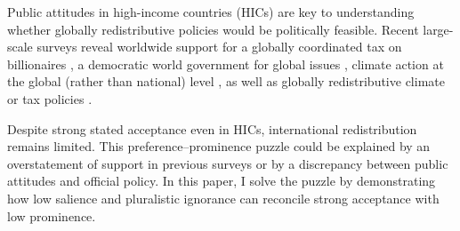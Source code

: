 \documentclass[12pt,english]{article}
\begin{document}
\begin{bibunit}
Public attitudes in high-income countries (HICs) are key to understanding whether globally redistributive policies would be politically feasible. 
Recent large-scale surveys reveal worldwide 
support for a globally coordinated tax on billionaires \citep{cappelen_majority_2025}, %
a democratic world government for global issues \citep{ghassim_who_2024}, climate action at the global (rather than national) level \citep{dechezlepretre_fighting_2025}, %
as well as globally redistributive climate or tax policies \citep{fabre_majority_2025}. 

Despite strong stated acceptance even in HICs, international redistribution remains limited. 
This preference--prominence puzzle could be explained by an overstatement of support in previous surveys or by a discrepancy between public attitudes and official policy. In this paper, I solve the puzzle by demonstrating how low salience and pluralistic ignorance can reconcile strong acceptance with low prominence. 


\end{bibunit}
\end{document}
